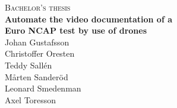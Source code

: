 \newpage
\restoregeometry
\thispagestyle{empty}
\mbox{}


\newpage
\thispagestyle{empty}
\begin{center}
	\textsc{\large Bachelor's thesis \the\year}\\[4cm]
	\textbf{\Large Automate the video documentation of a \\[0.5cm] Euro NCAP test by use of drones} \\[1.5cm]

 \centering
	{\large Johan Gustafsson \\[0.15cm] Christoffer Oresten \\[0.15cm] Teddy Sallén \\[0.15cm] Mårten Sanderöd \\[0.15cm] Leonard Smedenman \\[0.15cm] Axel Toresson } \setlength{\parskip}{1cm}
	

\end{center}
